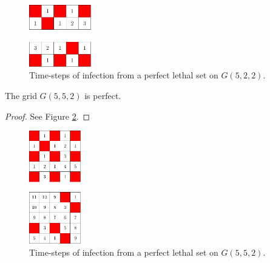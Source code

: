 \begin{figure}[H]
\centering
\includegraphics[width=0.24\textwidth]{figures/7/2x5x2_numbered_heatmap.pdf}
\caption{Time-steps of infection from a perfect lethal set on $G(5,2,2)$.}
\label{fig:2x5x2_numbered_heatmap}
\end{figure} 

\newpage

\begin{con}
\label{con:5x5x2}
The grid $G(5,5,2)$ is perfect.
\end{con}

\begin{proof}
See Figure \ref{fig:5x5x2_numbered_heatmap}.
\end{proof}

\begin{figure}[H]
\centering
\includegraphics[width=0.2\textwidth]{figures/A/5x5x2_numbered_heatmap.pdf}
\caption{Time-steps of infection from a perfect lethal set on $G(5,5,2)$.}
\label{fig:5x5x2_numbered_heatmap}
\end{figure}




